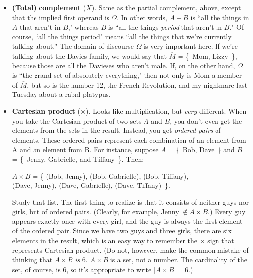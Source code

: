 \begin{itemize}
\item \label{complement} \textbf{(Total) complement} ($\overline{X}$).
 Same as the partial complement, above,
except that the implied first operand is $\Omega$. In other words, $A-B$ is
``all the things in $A$ that aren't in $B$," whereas $\overline{B}$ is
``all the things \textit{period} that aren't in $B$." Of course, ``all the
things period" means ``all the things that we're currently talking about."
The domain of discourse $\Omega$  is
very important here. If we're talking about the Davies family,
 we would say that $\overline{M}$ = \{~Mom,
Lizzy~\}, because those are all the Davieses who aren't male. If, on the
other hand, $\Omega$ is ``the grand set of absolutely everything," then not
only is Mom a member of $\overline{M}$, but so is the number 12, the
French Revolution, and my nightmare last Tuesday about a rabid platypus.

\item \textbf{Cartesian product} ($\times$).  Looks like multiplication, but \textit{very} different. When
you take the Cartesian product of two sets $A$ and $B$, you don't even get
the elements from the sets in the result. Instead, you get \textit{ordered
pairs}  of elements. These ordered pairs represent
each combination of an element from A and an element from B. For instance,
suppose $A$ = \{~Bob, Dave~\} and $B$ = \{~Jenny, Gabrielle, and
Tiffany~\}. Then:

\begin{center}
$A \times B$ = \{
(Bob, Jenny), (Bob, Gabrielle), (Bob, Tiffany),\\
(Dave, Jenny), (Dave, Gabrielle), (Dave, Tiffany)~\}.
\end{center}

Study that list. The first thing to realize is that it consists of neither
guys nor girls, but of ordered pairs. (Clearly, for example, Jenny $\notin
A\times B$.) Every guy appears exactly once with every girl, and the guy is
always the first element of the ordered pair.  Since we have two guys and
three girls, there are six elements in the result, which is an easy way to
remember the $\times$ sign that represents Cartesian product. (Do not,
however, make the common mistake of thinking that $A \times B$ \textit{is}
6. $A \times B$ is a set, not a number. The cardinality of the set, of
course, is 6, so it's appropriate to write $|A \times B| = 6$.)

\end{itemize}

